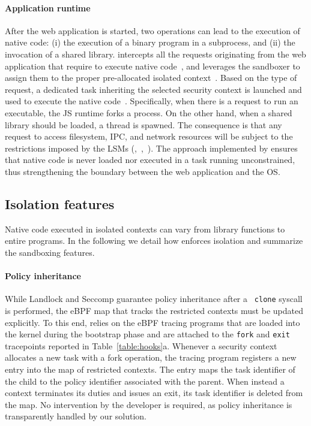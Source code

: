 \paragraph{Application runtime}
After the web application is started, two operations can lead to the
execution of native code: (i) the execution of a binary program in a
subprocess, and (ii) the invocation of a shared library. \natisand
intercepts all the requests originating from the web application that
require to execute native code~, and leverages the
sandboxer to assign them to the proper pre-allocated isolated
context~. Based on the type of request, a dedicated
task inheriting the selected security context is launched and
used to execute the native code~.
Specifically, when there is a request to run an executable,
the JS runtime forks a process. On the other hand, when a shared
library should be loaded, a thread is spawned. The consequence is
that any request to access filesystem, IPC, and network resources will
be subject to the restrictions imposed by the LSMs
(,~,~). The approach
implemented by \natisand ensures that native code is never loaded nor
executed in a task running unconstrained, thus strengthening the
boundary between the web application and the OS.

\subsection{Isolation features}
\label{subsect:isolation}

Native code executed in isolated contexts can vary from library
functions to entire programs. In the following we detail how \natisand
enforces isolation and summarize the sandboxing features.

\paragraph{Policy inheritance}
While Landlock and Seccomp guarantee policy inheritance after a {\tt
  clone} syscall is performed, the eBPF map that tracks the
restricted contexts must be updated explicitly. To this end, \natisand
relies on the eBPF tracing programs that are loaded into the
kernel during the bootstrap phase and are attached to the {\tt fork}
and {\tt exit} tracepoints reported in
Table~\ref{table:hooks}a. Whenever a security context allocates a new
task with a fork operation, the tracing program registers
a new entry into the map of restricted contexts. The entry
  maps the task identifier of the child to the policy identifier
  associated with the parent. When instead a context terminates its
  duties and issues an exit, its task identifier is deleted from the
  map. No intervention by the developer is required, as policy
inheritance is transparently handled by our solution.

